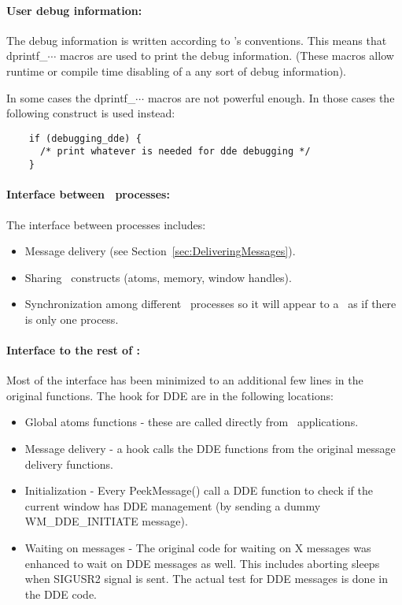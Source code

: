 \paragraph{User debug information:}
The debug information is written according to \Wine's
conventions. This means that dprintf\_$\cdots$ macros are used to
print the debug information. (These macros allow runtime or compile time
disabling of a any sort of debug information).

In some cases the dprintf\_$\cdots$ macros are not powerful enough. In
those cases the following construct is used instead:
\begin{verbatim}
    if (debugging_dde) {
      /* print whatever is needed for dde debugging */
    }
\end{verbatim}


\paragraph{Interface between \Wine\ processes:}
The interface between processes includes:
\begin{itemize}
  \item Message delivery (see Section~\ref{sec:DeliveringMessages}).
  \item Sharing \windoz\ constructs (atoms, memory, window
    handles).
  \item Synchronization among different \Wine\ processes so it will
    appear to a \windoz\ as if there is only one process.
\end{itemize}

\paragraph{Interface to the rest of \Wine:}
Most of the interface has been minimized to an additional few lines in
the original functions. The hook for DDE are in the following
locations:
\begin{itemize}
  \item Global atoms functions - these are called directly from
    \windoz\ applications. 
  \item Message delivery - a hook calls the DDE functions from the
    original message delivery functions.
  \item Initialization - Every PeekMessage() call a DDE function to
    check if the current window has DDE management (by sending
    a dummy WM\_DDE\_INITIATE message).
  \item Waiting on messages - The original code for waiting on X
    messages was enhanced to wait on DDE messages as well. This
    includes aborting sleeps when SIGUSR2 signal is sent. The actual
    test for DDE messages is done in the DDE code.
\end{itemize}

